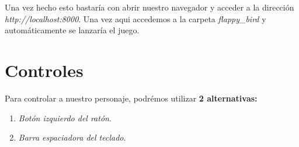\documentclass[12zpt]{article}
\begin{document}
\noindent{}

Una vez hecho esto bastaría con abrir nuestro navegador y acceder a la dirección \textit{http://localhost:8000}. Una vez aqui accedemos a la 
carpeta \textit{flappy\_bird} y automáticamente se lanzaría el juego.

\noindent{}
\noindent{}


\section{Controles}
Para controlar a nuestro personaje, podrémos utilizar \textbf{2 alternativas:}

\begin{enumerate}
	\item \textit{Botón izquierdo del ratón}.
	\item \textit{Barra espaciadora del teclado}.
\end{enumerate}
\end{document}
